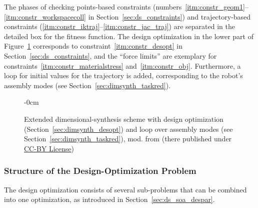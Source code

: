 The phases of checking points-based constraints (numbers~\ref{itm:constr_geom1}--\ref{itm:constr_workspacecoll} in Section~\ref{sec:ds_constraints}) and trajectory-based constraints (\ref{itm:constr_iktraj}--\ref{itm:constr_jac_traj}) are separated in the detailed box for the fitness function.
The design optimization {in the lower part of Figure~\ref{fig:optimization_flowchart_desopt}} corresponds to constraint~\ref{itm:constr_desopt} in Section~\ref{sec:ds_constraints}, and the ``force limits'' are exemplary for constraints~\ref{itm:constr_materialstress} and~\ref{itm:constr_obj}.
Furthermore, a loop for initial values for the trajectory is added, corresponding to the robot's assembly modes {(see Section~\ref{sec:dimsynth_taskred}).}

\vspace{-6pt}
\begin{figure}[H]
\begin{adjustwidth}{-\extralength}{0cm}
\centering
\graphicspath{{Figures/}}

\end{adjustwidth}
\caption{Extended dimensional-synthesis scheme with design optimization (Section~\ref{sec:dimsynth_desopt}) and loop over assembly modes (see Section~\ref{sec:dimsynth_taskred}), mod. from \cite{SchapplerJahRaaOrt2022} (there published under \href{http://creativecommons.org/licenses/by/4.0/}{CC-BY License})} %
%
\label{fig:optimization_flowchart_desopt}
\end{figure}

\subsubsection{Structure of the Design-Optimization Problem}

The design optimization consists of several sub-problems that can be combined into one optimization, as introduced in Section~\ref{sec:ds_soa_despar}.
%
%
%
%
%
%
%
%
%


